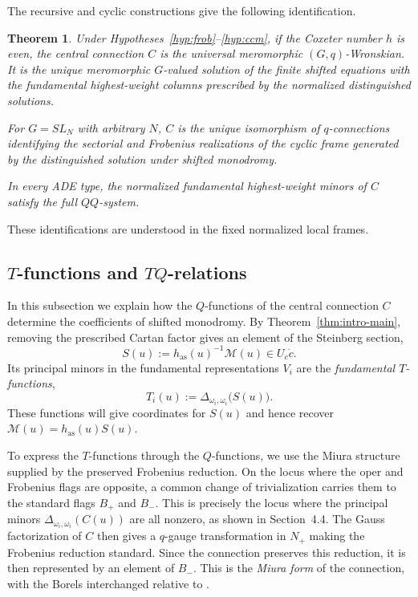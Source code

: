 \documentclass[11pt,leqno]{amsart}
\numberwithin{equation}{section}
\theoremstyle{plain}
\newtheorem{theorem}{Theorem}[section]
\theoremstyle{definition}
\theoremstyle{plain}
\theoremstyle{definition}
\theoremstyle{remark}
\begin{document}
The recursive and cyclic constructions give the following identification.
\begin{theorem}\label{thm:intro-reconstruction}
Under Hypotheses~\ref{hyp:frob}--\ref{hyp:ccm}, if the Coxeter number $h$ is even, the central connection $C$ is the universal meromorphic $(G,q)$-Wronskian.  It is the unique meromorphic $G$-valued solution of the finite shifted equations with the fundamental highest-weight columns prescribed by the normalized distinguished solutions.

For $G=SL_N$ with arbitrary $N$, $C$ is the unique isomorphism of $q$-connections identifying the sectorial and Frobenius realizations of the cyclic frame generated by the distinguished solution under shifted monodromy.

In every ADE type, the normalized fundamental highest-weight minors of $C$ satisfy the full $QQ$-system.
\end{theorem}
These identifications are understood in the fixed normalized local frames.

\subsection{\texorpdfstring{$T$}{T}-functions and \texorpdfstring{$TQ$}{TQ}-relations}\label{sec:intro-T-functions}

In this subsection we explain how the $Q$-functions of the central connection $C$ determine the coefficients of shifted monodromy.  By Theorem~\ref{thm:intro-main}, removing the prescribed Cartan factor gives an element of the Steinberg section,
\[
 S(u):=h_{\mathrm{as}}(u)^{-1}\mathscr M(u)\in U_c\dot c.
\]
Its principal minors in the fundamental representations $V_i$ are the \emph{fundamental $T$-functions},
\begin{equation}\label{eq:intro-T-coordinate}
 T_i(u):=\Delta_{\omega_i,\omega_i}\bigl(S(u)\bigr).
\end{equation}
These functions will give coordinates for $S(u)$ and hence recover $\mathscr M(u)=h_{\mathrm{as}}(u)S(u)$.

To express the $T$-functions through the $Q$-functions, we use the Miura structure supplied by the preserved Frobenius reduction.  On the locus where the oper and Frobenius flags are opposite, a common change of trivialization carries them to the standard flags $B_+$ and $B_-$.  This is precisely the locus where the principal minors $\Delta_{\omega_i,\omega_i}(C(u))$ are all nonzero, as shown in Section~4.4.  The Gauss factorization of $C$ then gives a $q$-gauge transformation in $N_+$ making the Frobenius reduction standard.  Since the connection preserves this reduction, it is then represented by an element of $B_-$.  This is the \emph{Miura form} of the connection, with the Borels interchanged relative to \cite[Corollary~3.4]{FKSZ2020}.
\end{document}
